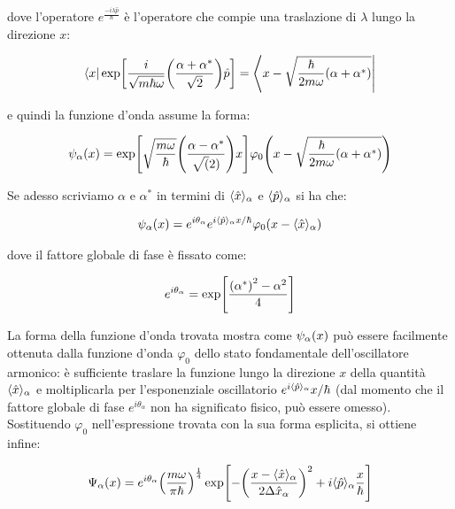 	dove l'operatore $e^{\frac{-i\lambda \hat{p}}{\hbar}}$ è l'operatore che compie una traslazione di $\lambda$ lungo la direzione $x$:
	
\begin{align*}
	\bra{x} \text{exp}\qty[\frac{i}{\sqrt{m \hbar \omega}} \qty(\frac{\alpha + \alpha^*}{\sqrt{2}}) \hat{p}] = \bra{x - \sqrt{\frac{\hbar}{2m\omega} \qty(\alpha + \alpha^*)}}
\end{align*}

	e quindi la funzione d'onda assume la forma:
	
\begin{align*}
	\psi_{\alpha}\qty(x) = \text{exp}\qty[\sqrt{\frac{m\omega}{\hbar}} \qty(\frac{\alpha - \alpha^*}{\sqrt(2)}) x ] \varphi_0 \qty(x - \sqrt{\frac{\hbar}{2m\omega} \qty(\alpha + \alpha^*)})
\end{align*}

	Se adesso scriviamo $\alpha$ e $\alpha^*$ in termini di $\langle \hat{x} \rangle_{\alpha}$ e $\langle \hat{p} \rangle_{\alpha}$ si ha che:
	
\begin{align*}
	\psi_{\alpha}\qty(x) = e^{i \theta_{\alpha}} e^{i \langle \hat{p} \rangle_{\alpha} x / \hbar} \varphi_0 \qty(x - \langle \hat{x} \rangle_{\alpha}) 
\end{align*}

	dove il fattore globale di fase è fissato come:
	
\begin{align*}
	e^{i \theta_{\alpha}} = \text{exp}\qty[\frac{\qty(\alpha^*)^2 - \alpha^2}{4}]
\end{align*}

	La forma della funzione d'onda trovata mostra come $\psi_{\alpha}\qty(x)$ può essere facilmente ottenuta dalla funzione d'onda $\varphi_0$ dello stato fondamentale dell'oscillatore armonico: è sufficiente traslare la funzione lungo la direzione $x$ della quantità $\langle \hat{x} \rangle_{\alpha}$ e moltiplicarla per l'esponenziale oscillatorio $e^{i \langle \hat{p} \rangle_{\alpha}} x / \hbar $ (dal momento che il fattore globale di fase $e^{i \theta_{\alpha}}$ non ha significato fisico, può essere omesso). Sostituendo $\varphi_0$ nell'espressione trovata con la sua forma esplicita, si ottiene infine:
	
\begin{align*}
	\Psi_{\alpha}\qty(x) = e^{ i \theta_{\alpha}} \qty(\frac{m \omega}{ \pi \hbar})^{\frac{1}{4}} \, \text{exp} \qty[ - \qty(\frac{x - \langle \hat{x} \rangle_{\alpha}}{2 \Delta \hat{x}_{\alpha}})^2 + i \langle \hat{p} \rangle_{\alpha} \frac{x}{\hbar}]
\end{align*}

